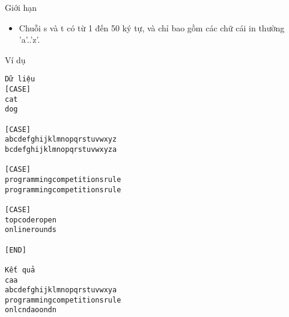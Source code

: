 Giới hạn  
\begin{itemize}
	\item     Chuỗi s và t có từ 1 đến 50 ký tự, và chỉ bao gồm các chữ cái in thường 'a'..'z'.   
\end{itemize}
   Ví dụ  
\begin{verbatim}
Dữ liệu
[CASE]
cat
dog

[CASE]
abcdefghijklmnopqrstuvwxyz
bcdefghijklmnopqrstuvwxyza

[CASE]
programmingcompetitionsrule
programmingcompetitionsrule

[CASE]
topcoderopen
onlinerounds

[END]

Kết quả
caa
abcdefghijklmnopqrstuvwxya
programmingcompetitionsrule
onlcndaoondn
\end{verbatim}